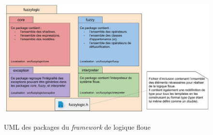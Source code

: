 \documentclass[a4paper,11pt]{article}
\begin{document}
    \begin{figure}[H]
        \begin{center}
            \caption{UML des packages du \textit{framework} de logique floue}
            \includegraphics[scale=0.51]{assets/Packages_(UML).jpg}
            \label{fig:umlPackage}
        \end{center}
    \end{figure}
\end{document}
